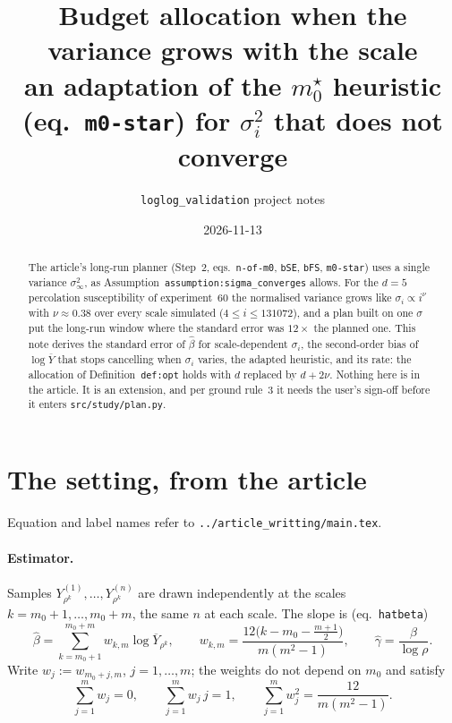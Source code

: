 \documentclass[11pt]{article}
\title{Budget allocation when the variance grows with the scale\\
\large an adaptation of the $m_0^\star$ heuristic (eq.~\texttt{m0-star})
for $\sigma_i^2$ that does not converge}
\author{\texttt{loglog\_validation} project notes}
\date{2026-11-13}
\begin{document}
\maketitle

\begin{abstract}
The article's long-run planner (Step~2, eqs.~\texttt{n-of-m0}, \texttt{bSE},
\texttt{bFS}, \texttt{m0-star}) uses a single variance $\sigma_\infty^2$, as
Assumption~\texttt{assumption:}\allowbreak\texttt{sigma\_converges} allows. For the $d=5$
percolation susceptibility of experiment~60 the normalised variance grows like
$\sigma_i\propto i^{\nu}$ with $\nu\approx0.38$ over every scale simulated
($4\le i\le131072$), and a plan built on one $\sigma$ put the long-run window
where the standard error was $12\times$ the planned one. This note derives the
standard error of $\hat\beta$ for scale-dependent $\sigma_i$, the second-order
bias of $\log\overline Y$ that stops cancelling when $\sigma_i$ varies, the
adapted heuristic, and its rate: the allocation of Definition~\texttt{def:opt}
holds with $d$ replaced by $d+2\nu$. Nothing here is in the article. It is an
extension, and per ground rule~3 it needs the user's sign-off before it enters
\texttt{src/study/plan.py}.
\end{abstract}

\tableofcontents

\section{The setting, from the article}

Equation and label names refer to \texttt{../article\_writting/main.tex}.

\paragraph{Estimator.} Samples $Y^{(1)}_{\rho^k},\dots,Y^{(n)}_{\rho^k}$ are
drawn independently at the scales $k=m_0+1,\dots,m_0+m$, the same $n$ at each
scale. The slope is (eq.~\texttt{hatbeta})
\begin{equation}
  \hat\beta=\sum_{k=m_0+1}^{m_0+m} w_{k,m}\log\overline Y_{\rho^k},
  \qquad
  w_{k,m}=\frac{12\bigl(k-m_0-\frac{m+1}{2}\bigr)}{m(m^2-1)},
  \qquad
  \hat\gamma=\frac{\hat\beta}{\log\rho}.
  \label{eq:hatbeta}
\end{equation}
Write $w_j:=w_{m_0+j,m}$, $j=1,\dots,m$; the weights do not depend on $m_0$ and
satisfy
\begin{equation}
  \sum_{j=1}^m w_j=0,\qquad \sum_{j=1}^m w_j\,j=1,\qquad
  \sum_{j=1}^m w_j^2=\frac{12}{m(m^2-1)}.
  \label{eq:wsums}
\end{equation}
\end{document}
